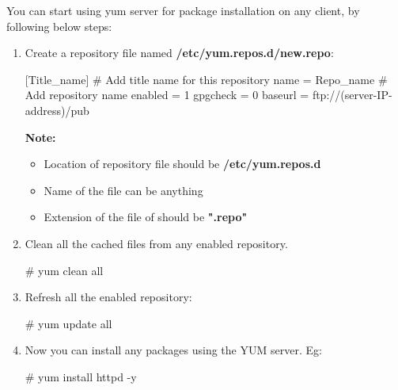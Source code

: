 \setlength{\columnsep}{3pt}
\begin{flushleft}
	\bigskip
	You can start using yum server for package installation on any client, by following below steps:
	
	\begin{enumerate}
		\item Create a repository file named \textbf{/etc/yum.repos.d/new.repo}:
		\begin{tcolorbox}[breakable,notitle,boxrule=-0pt,colback=black,colframe=black]
			\color{white}
			\font=9pt
			[Title\_name] \color{yellow}  \# Add title name for this repository 
			\newline
			\color{white}
			name = Repo\_name
			\color{yellow}
			\# Add repository name
			\newline
			\color{white}
			enabled = 1
			\newline
			gpgcheck = 0
			\newline
			baseurl = ftp://(server-IP-address)/pub
			\font=4pt
		\end{tcolorbox}
		\bigskip
		\begin{tcolorbox}[breakable,notitle,boxrule=-0pt,colback=yellow,colframe=yellow]
			\color{black}
			\textbf{Note:} 
			\begin{itemize}
				\item Location of repository file should be \textbf{/etc/yum.repos.d}
				\item Name of the file can be anything
				\item Extension of the file of should be \textbf{".repo"}
			\end{itemize}
		\end{tcolorbox}

		
		
		\item Clean all the cached files from any enabled repository.
		\begin{tcolorbox}[breakable,notitle,boxrule=-0pt,colback=black,colframe=black]
			\color{green}
			\font=9pt
			\# yum	clean	all
			\font=4pt
		\end{tcolorbox}
		
		
		\item Refresh all the enabled repository:
		\begin{tcolorbox}[breakable,notitle,boxrule=-0pt,colback=black,colframe=black]
			\color{green}
			\font=9pt
			\# yum 	update 	all
			\font=4pt
		\end{tcolorbox}
		
		
		\item Now you can install any packages using the YUM server.
		\newline
		Eg:
		\begin{tcolorbox}[breakable,notitle,boxrule=-0pt,colback=black,colframe=black]
			\color{green}
			\font=9pt
			\# yum	install	httpd -y		
			\font=4pt
		\end{tcolorbox}

		
	\end{enumerate}
	
	
	
\end{flushleft}
\newpage



